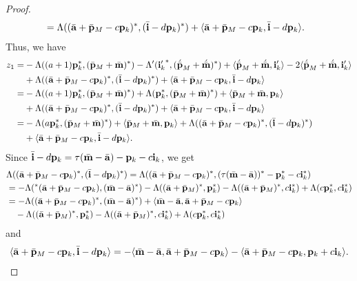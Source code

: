 \documentclass[reqno,12pt]{amsart}
\numberwithin{equation}{section}
\def\lr#1{\langle #1\rangle} \def\fin{\hfill$\square$}  \def\lra{\longrightarrow} \def\mod{\mbox{\rm \textbf{mod}}\,}\def\Mod{\mbox{\rm mod}\,}\def\top{\mbox{\rm top}\,}\def\soc{\mbox{\rm soc}\,}
\theoremstyle{plain} %
\theoremstyle{definition} %
\begin{document}
\begin{proof}
\begin{align*}
&=\Lambda(({\bar{{\bf a}}}+{\bar{{\bf p}}}_M-c{{\bf p}_k})^\ast,({\bar{{\bf i}}}-d{{\bf p}_k})^\ast)+\lr{{\bar{{\bf a}}}+{\bar{{\bf p}}}_M-c{{\bf p}_k},{\bar{{\bf i}}}-d{{\bf p}_k}}.\end{align*}
Thus, we have
\begin{align*}z_1=&-\Lambda((a+1)\mathbf{p}_k^\ast,(\bar{\bf p}_M+\bar{\bf m})^\ast)-\Lambda'({{\bf i}_k'}^\ast,({\acute{\bar{\bf p}}}_M+{\acute{\bar{\bf m}}})^\ast)+\lr{{\acute{\bar{\bf p}}}_M+{\acute{\bar{\bf m}}},{\bf i}_k'}-2\lr{{\acute{\bar{\bf p}}}_M+{\acute{\bar{\bf m}}},{\bf i}_k'}\\&
+\Lambda(({\bar{{\bf a}}}+{\bar{{\bf p}}}_M-c{{\bf p}_k})^\ast,({\bar{{\bf i}}}-d{{\bf p}_k})^\ast)+\lr{{\bar{{\bf a}}}+{\bar{{\bf p}}}_M-c{{\bf p}_k},{\bar{{\bf i}}}-d{{\bf p}_k}}\\
=&-\Lambda((a+1)\mathbf{p}_k^\ast,(\bar{\bf p}_M+\bar{\bf m})^\ast)+\Lambda({\bf p}_k^\ast,({\bar{\bf p}}_M+{\bar{\bf m}})^\ast)+\lr{{\bar{\bf p}}_M+{\bar{\bf m}},{\bf p}_k}\\&
+\Lambda(({\bar{{\bf a}}}+{\bar{{\bf p}}}_M-c{{\bf p}_k})^\ast,({\bar{{\bf i}}}-d{{\bf p}_k})^\ast)+\lr{{\bar{{\bf a}}}+{\bar{{\bf p}}}_M-c{{\bf p}_k},{\bar{{\bf i}}}-d{{\bf p}_k}}\\
=&-\Lambda(a\mathbf{p}_k^\ast,(\bar{\bf p}_M+\bar{\bf m})^\ast)+\lr{{\bar{\bf p}}_M+{\bar{\bf m}},{\bf p}_k}
+\Lambda(({\bar{{\bf a}}}+{\bar{{\bf p}}}_M-c{{\bf p}_k})^\ast,({\bar{{\bf i}}}-d{{\bf p}_k})^\ast)\\&+\lr{{\bar{{\bf a}}}+{\bar{{\bf p}}}_M-c{{\bf p}_k},{\bar{{\bf i}}}-d{{\bf p}_k}}.\end{align*}
Since $\bar{{\bf i}}-d{\bf p}_k=\tau(\bar{{\bf m}}-\bar{{\bf a}})-{\bf p}_k-c{\bf i}_k$, we get
\begin{align*}&\Lambda(({\bar{{\bf a}}}+{\bar{{\bf p}}}_M-c{{\bf p}_k})^\ast,({\bar{{\bf i}}}-d{{\bf p}_k})^\ast)=\Lambda(({\bar{{\bf a}}}+{\bar{{\bf p}}}_M-c{{\bf p}_k})^\ast,(\tau(\bar{{\bf m}}-\bar{{\bf a}}))^\ast-{\bf p}_k^\ast-c{\bf i}_k^\ast)\\
&=-\Lambda({^\ast}({\bar{{\bf a}}}+{\bar{{\bf p}}}_M-c{{\bf p}_k}),({\bar{{\bf m}}}-{\bar{{\bf a}}})^\ast)-\Lambda((\bar{{\bf a}}+\bar{{\bf p}}_M)^\ast,{\bf p}_k^\ast)-\Lambda((\bar{{\bf a}}+\bar{{\bf p}}_M)^\ast,c{\bf i}_k^\ast)+\Lambda(c{\bf p}_k^\ast,c{\bf i}_k^\ast)\\
&=-\Lambda(({\bar{{\bf a}}}+{\bar{{\bf p}}}_M-c{{\bf p}_k})^\ast,({\bar{{\bf m}}}-{\bar{{\bf a}}})^\ast)+\lr{\bar{{\bf m}}-\bar{{\bf a}},\bar{{\bf a}}+\bar{{\bf p}}_M-c{\bf p}_k}\\&\quad-\Lambda((\bar{{\bf a}}+\bar{{\bf p}}_M)^\ast,{\bf p}_k^\ast)-\Lambda((\bar{{\bf a}}+\bar{{\bf p}}_M)^\ast,c{\bf i}_k^\ast)+\Lambda(c{\bf p}_k^\ast,c{\bf i}_k^\ast)\end{align*}
and
\begin{align*}
\lr{{\bar{{\bf a}}}+{\bar{{\bf p}}}_M-c{{\bf p}_k},{\bar{{\bf i}}}-d{{\bf p}_k}}=-\lr{\bar{{\bf m}}-\bar{{\bf a}},{\bar{{\bf a}}}+{\bar{{\bf p}}}_M-c{{\bf p}_k}}-\lr{{\bar{{\bf a}}}+{\bar{{\bf p}}}_M-c{{\bf p}_k},{\bf p}_k+c{\bf i}_k}.
\end{align*}


\end{proof}
\end{document}
